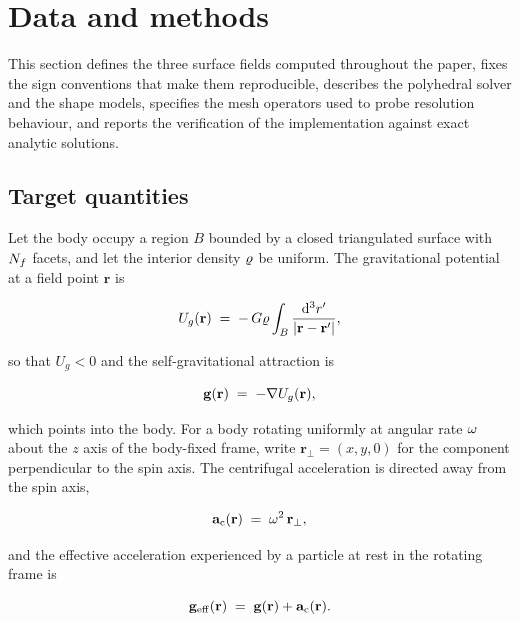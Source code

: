 \section{Data and methods}
\label{sec:methods}

This section defines the three surface fields computed throughout the paper,
fixes the sign conventions that make them reproducible, describes the
polyhedral solver and the shape models, specifies the mesh operators used to
probe resolution behaviour, and reports the verification of the implementation
against exact analytic solutions.

\subsection{Target quantities}
\label{sec:targets}

Let the body occupy a region $B$ bounded by a closed triangulated surface with
$N_{f}$ facets, and let the interior density $\varrho$ be uniform. The
gravitational potential at a field point $\mathbf{r}$ is

\begin{equation}
U_{g}(\mathbf{r}) \;=\; -\,G\varrho \int_{B}
\frac{\mathrm{d}^{3}r'}{\lvert \mathbf{r}-\mathbf{r}' \rvert},
\label{eq:Ug}
\end{equation}

so that $U_{g}<0$ and the self-gravitational attraction is

\begin{equation}
\mathbf{g}(\mathbf{r}) \;=\; -\nabla U_{g}(\mathbf{r}),
\label{eq:g}
\end{equation}

which points into the body. For a body rotating uniformly at angular rate
$\omega$ about the $z$ axis of the body-fixed frame, write
$\mathbf{r}_{\perp}=(x,y,0)$ for the component perpendicular to the spin axis.
The centrifugal acceleration is directed away from the spin axis,

\begin{equation}
\mathbf{a}_{\mathrm{c}}(\mathbf{r}) \;=\; \omega^{2}\,\mathbf{r}_{\perp},
\label{eq:acf}
\end{equation}

and the effective acceleration experienced by a particle at rest in the
rotating frame is

\begin{equation}
\mathbf{g}_{\mathrm{eff}}(\mathbf{r}) \;=\; \mathbf{g}(\mathbf{r}) + \mathbf{a}_{\mathrm{c}}(\mathbf{r}).
\label{eq:geff}
\end{equation}

